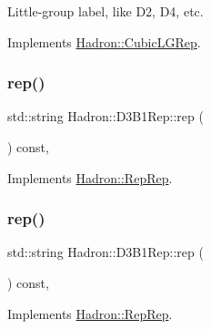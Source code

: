 Little-\/group label, like D2, D4, etc. 

Implements \mbox{\hyperlink{structHadron_1_1CubicLGRep_a9bdb14b519a611d21379ed96a3a9eb41}{Hadron\+::\+Cubic\+L\+G\+Rep}}.

\mbox{\label{structHadron_1_1D3B1Rep_a12a506574bb30503f11952150a0a7d6f}} 
\subsubsection{\texorpdfstring{rep()}{rep()}\hspace{0.1cm}{\footnotesize\ttfamily [1/5]}}
{\footnotesize\ttfamily std\+::string Hadron\+::\+D3\+B1\+Rep\+::rep (\begin{DoxyParamCaption}{ }\end{DoxyParamCaption}) const\hspace{0.3cm}{\ttfamily [inline]}, {\ttfamily [virtual]}}



Implements \mbox{\hyperlink{structHadron_1_1RepRep_ab3213025f6de249f7095892109575fde}{Hadron\+::\+Rep\+Rep}}.

\mbox{\label{structHadron_1_1D3B1Rep_a12a506574bb30503f11952150a0a7d6f}} 
\subsubsection{\texorpdfstring{rep()}{rep()}\hspace{0.1cm}{\footnotesize\ttfamily [2/5]}}
{\footnotesize\ttfamily std\+::string Hadron\+::\+D3\+B1\+Rep\+::rep (\begin{DoxyParamCaption}{ }\end{DoxyParamCaption}) const\hspace{0.3cm}{\ttfamily [inline]}, {\ttfamily [virtual]}}



Implements \mbox{\hyperlink{structHadron_1_1RepRep_ab3213025f6de249f7095892109575fde}{Hadron\+::\+Rep\+Rep}}.

\mbox{\label{structHadron_1_1D3B1Rep_a12a506574bb30503f11952150a0a7d6f}} 
